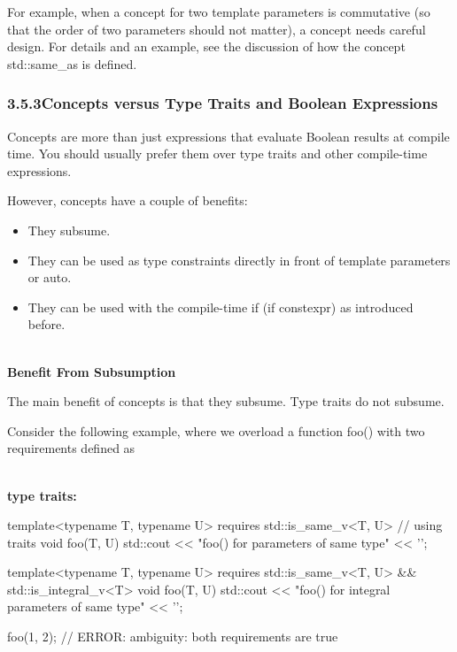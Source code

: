 For example, when a concept for two template parameters is commutative (so that the order of two parameters should not matter), a concept needs careful design. For details and an example, see the discussion of how the concept std::same\_as is defined.

\subsubsection*{ 3.5.3\hspace{0.2cm}Concepts versus Type Traits and Boolean Expressions}

Concepts are more than just expressions that evaluate Boolean results at compile time. You should usually prefer them over type traits and other compile-time expressions.

However, concepts have a couple of benefits:

\begin{itemize}
\item
They subsume.

\item
They can be used as type constraints directly in front of template parameters or auto.

\item
They can be used with the compile-time if (if constexpr) as introduced before.
\end{itemize}

\noindent
\hspace*{\fill} \\ %
\textbf{Benefit From Subsumption}


The main benefit of concepts is that they subsume. Type traits do not subsume.

Consider the following example, where we overload a function foo() with two requirements defined as


\noindent
\hspace*{\fill} \\ %
\textbf{type traits:}

\begin{cpp}
template<typename T, typename U>
requires std::is_same_v<T, U> // using traits
void foo(T, U)
{
	std::cout << "foo() for parameters of same type" << '\n';
}

template<typename T, typename U>
requires std::is_same_v<T, U> && std::is_integral_v<T>
void foo(T, U)
{
	std::cout << "foo() for integral parameters of same type" << '\n';
}

foo(1, 2); // ERROR: ambiguity: both requirements are true
\end{cpp}

